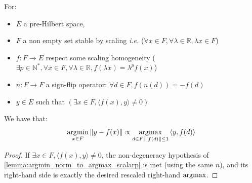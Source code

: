 \begin{corollary}\label{corollary:argmin_norm_to_argmax_scalarp}

For:

\begin{itemize}
\item
  \(E\) a pre-Hilbert space,
\item
  \(F\) a non empty set stable by scaling \emph{i.e.}
  (\(\forall x \in F,\forall\lambda \in \mathbb{R},\lambda x \in F\))
\item
  \(f:F \rightarrow E\) respect some scaling homogeneity
  (\(\exists p \in \mathbb{N}^{\ast},\forall x \in F,\forall\lambda \in \mathbb{R},f(\lambda x) = \lambda^{p}f(x)\))
\item
  \(n:F \rightarrow F\) a sign-flip operator:
  \(\forall d \in F,f\left( n(d) \right) = - f(d)\)
\item
  \(y \in E\) such that
  \(\left( \exists x \in F,{\langle f(x),y\rangle} \neq 0 \right)\) %
\end{itemize}

We have that:
\[\operatorname*{\arg\!\min}_{x \in F}\left\| {y - f(x)} \right\| \propto \operatorname*{\arg\!\max}_{d \in F|\left\| {f(d)} \right\| \leq 1}{\langle y,f(d)\rangle}\]

\end{corollary}

\begin{proof}
\leavevmode\par\vspace{0.5\baselineskip}

If \(\exists x \in F,{\langle f(x),y\rangle} \neq 0\), the non-degeneracy hypothesis of \autoref{lemma:argmin_norm_to_argmax_scalarp} is met (using the same \(n\)), and its right-hand side is exactly the desired rescaled right-hand \(\operatorname*{\arg\!\max}\).


\end{proof}

